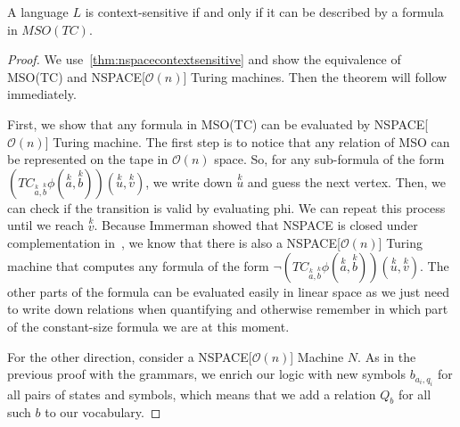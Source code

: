 \begin{theorem}\label{thm:contextsensitveMSOTC}
    A language $L$ is context-sensitive if and only if it can be described by a formula in $MSO(TC)$.
\end{theorem}

\begin{proof}
    We use~\cref{thm:nspacecontextsensitive} and show the equivalence of MSO(TC) and NSPACE[$\mathcal{O}(n)$] Turing machines.
    Then the theorem will follow immediately.

    First, we show that any formula in MSO(TC) can be evaluated by NSPACE[$\mathcal{O}(n)$] Turing machine.
    The first step is to notice that any relation of MSO can be represented on the tape in $\mathcal{O}(n)$ space.
    So, for any sub-formula of the form $\left(TC_{\overset{k}{a}, \overset{k}{b}}\phi\left(\overset{k}{a}, \overset{k}{b}\right)\right)\left(\overset{k}{u}, \overset{k}{v}\right)$, we write down $\overset{k}{u}$ and guess the next vertex.
    Then, we can check if the transition is valid by evaluating phi.
    We can repeat this process until we reach $\overset{k}{v}$.
    Because Immerman showed that NSPACE is closed under complementation in~\cite{Immerman1988}, we know that there is also a NSPACE[$\mathcal{O}(n)$] Turing machine that computes any formula of the form $\neg\left(TC_{\overset{k}{a}, \overset{k}{b}}\phi\left(\overset{k}{a}, \overset{k}{b}\right)\right)\left(\overset{k}{u}, \overset{k}{v}\right)$.
    The other parts of the formula can be evaluated easily in linear space as we just need to write down relations when quantifying and otherwise remember in which part of the constant-size formula we are at this moment.

    \vspace{5mm}

    For the other direction, consider a NSPACE[$\mathcal{O}(n)$] Machine $N$.
    As in the previous proof with the grammars, we enrich our logic with new symbols $b_{a_i, q_i}$ for all pairs of states and symbols, which means that we add a relation $Q_{b}$ for all such $b$ to our vocabulary.



\end{proof}
